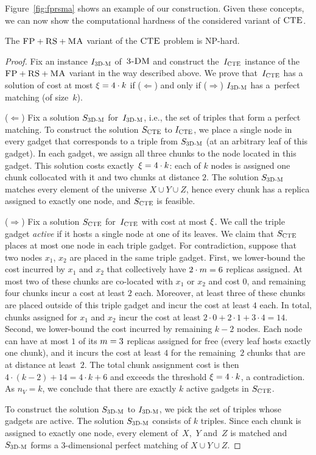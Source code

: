Figure~\ref{fig:fprsma} shows an example of our construction.
Given these concepts, we can now show the computational hardness of the considered variant of $\textsc{CTE}$.
\begin{theorem}
  The $\textsc{FP}+\textsc{RS}+\textsc{MA}$ variant of the $\textsc{CTE}$ problem is NP-hard.
  \label{th:ma-unlimited}
\end{theorem}
\begin{proof}
Fix an instance $I_{\mathrm{\textsc{3D-M}}}$ of~$\textsc{3-DM}$ and construct the~$I_{\mathrm{\textsc{CTE}}}$ instance of
the~$\textsc{FP}+\textsc{RS}+\textsc{MA}$ variant in the way described above. We prove that~$I_{\mathrm{\textsc{CTE}}}$ has a solution of cost at most $\xi = 4 \cdot k$ if ($\Leftarrow$) and only if
($\Rightarrow$)
$I_{\mathrm{\textsc{3D-M}}}$ has a~perfect matching (of size~$k$).

\medskip

($\Leftarrow$) Fix a solution $S_{\mathrm{\textsc{3D-M}}}$ for~$I_{\mathrm{\textsc{3D-M}}}$, i.e., the set of triples that form a perfect matching. To construct the solution $S_{\mathrm{\textsc{CTE}}}$ to $I_{\mathrm{\textsc{CTE}}}$, we place a single node in every
gadget that corresponds to a triple from $S_{\mathrm{\textsc{3D-M}}}$ (at an arbitrary leaf of this gadget). In each gadget, we assign all three chunks to the node located in this gadget. This
solution costs exactly~$\xi = 4\cdot k$: each of $k$ nodes is assigned one chunk collocated with it and two chunks at distance $2$.
The solution $S_{\mathrm{\textsc{3D-M}}}$ matches every element of the universe $X \cup Y \cup Z$, hence every chunk has a replica assigned to exactly one node, and $S_{\mathrm{\textsc{CTE}}}$ is feasible.

\medskip

($\Rightarrow$) Fix a solution $S_{\mathrm{\textsc{CTE}}}$ for~$I_{\mathrm{\textsc{CTE}}}$ with cost at most $\xi$.
We call the triple gadget \emph{active} if it hosts a single node at one of its leaves.
We claim that $S_{\mathrm{\textsc{CTE}}}$ places at most one node in each triple gadget.
For contradiction, suppose that two nodes $x_1$, $x_2$ are placed in the same triple gadget.
First, we lower-bound the cost incurred by $x_1$ and $x_2$ that collectively have $2\cdot m = 6$ replicas assigned.
At most two of these chunks are co-located with $x_1$ or $x_2$ and cost $0$, and remaining four chunks incur a cost at least $2$ each.
Moreover, at least three of these chunks are placed outside of this triple gadget and incur the cost at least $4$ each.
In total, chunks assigned for $x_1$ and $x_2$ incur the cost at least $2\cdot 0+2\cdot 1+3\cdot 4=14$.
Second, we lower-bound the cost incurred by remaining $k-2$ nodes.
Each node can have at most $1$ of its $m=3$ replicas assigned for free (every leaf hosts exactly one chunk),
and it incurs the cost at least $4$ for the remaining~$2$ chunks that are at distance at least~$2$.
The total chunk assignment cost is then $4\cdot (k-2)+14 = 4\cdot k + 6$ and exceeds the threshold $\xi = 4\cdot k$, a contradiction.
As $n_V = k$, we conclude that there are exactly $k$ active gadgets in $S_{\mathrm{\textsc{CTE}}}$.

To construct the solution $S_{\mathrm{\textsc{3D-M}}}$ to $I_{\mathrm{\textsc{3D-M}}}$, we pick the set of triples whose gadgets are active.
The solution $S_{\mathrm{\textsc{3D-M}}}$ consists of $k$ triples.
Since each chunk is assigned to exactly one node, every element of~$X$,~$Y$ and~$Z$ is matched and $S_{\mathrm{\textsc{3D-M}}}$ forms a 3-dimensional perfect matching of $X \cup Y\cup Z$.
\end{proof}

